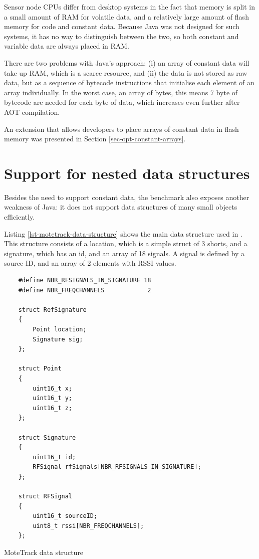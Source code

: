 Sensor node CPUs differ from desktop systems in the fact that memory is split in a small amount of RAM for volatile data, and a relatively large amount of flash memory for code and constant data. Because Java was not designed for such systems, it has no way to distinguish between the two, so both constant and variable data are always placed in RAM.

There are two problems with Java's approach: (i) an array of constant data will take up RAM, which is a scarce resource, and (ii) the data is not stored as raw data, but as a sequence of bytecode instructions that initialise each element of an array individually. In the worst case, an array of bytes, this means 7 byte of bytecode are needed for each byte of data, which increases even further after AOT compilation.

An extension that allows developers to place arrays of constant data in flash memory was presented in Section \ref{sec-opt-constant-arrays}.



 

\section{Support for nested data structures}
\label{sec-nested-data}
Besides the need to support constant data, the  benchmark also exposes another weakness of Java: it does not support data structures of many small objects efficiently.

Listing \ref{lst-motetrack-data-structure} shows the main  data structure used in . This structure consists of a location, which is a simple struct of 3 shorts, and a signature, which has an id, and an array of 18 signals. A signal is defined by a source ID, and an array of 2 elements with RSSI values.

\begin{listing}
\begin{verbatim}
    #define NBR_RFSIGNALS_IN_SIGNATURE 18
    #define NBR_FREQCHANNELS            2

    struct RefSignature
    {
        Point location;
        Signature sig;
    };

    struct Point
    {
        uint16_t x;
        uint16_t y;
        uint16_t z;
    };

    struct Signature
    {
        uint16_t id;
        RFSignal rfSignals[NBR_RFSIGNALS_IN_SIGNATURE];
    };

    struct RFSignal
    {
        uint16_t sourceID;
        uint8_t rssi[NBR_FREQCHANNELS];
    };
\end{verbatim}
\caption{MoteTrack  data structure}
\label{lst-motetrack-data-structure}
\end{listing}

